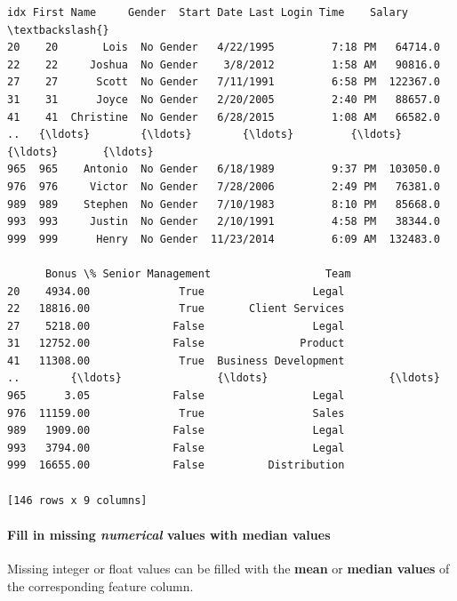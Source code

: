 \documentclass [oneside,10pt,a4paper,ngerman,BCOR10mm,headsepline,parindent,final]{scrartcl}
\makeatletter
\newcommand{\boxspacing}{\kern\kvtcb@left@rule\kern\kvtcb@boxsep}
\newcommand{\prompt}[4]{
        {\ttfamily\llap{{\color{#2}[#3]:\hspace{3pt}#4}}\vspace{-\baselineskip}}
    }
\makeatother
\begin{document}
            \begin{tcolorbox}[breakable, size=fbox, boxrule=.5pt, pad at break*=1mm, opacityfill=0]
\prompt{Out}{outcolor}{7}{\boxspacing}
\begin{Verbatim}[commandchars=\\\{\}]
     idx First Name     Gender  Start Date Last Login Time    Salary  \textbackslash{}
20    20       Lois  No Gender   4/22/1995         7:18 PM   64714.0
22    22     Joshua  No Gender    3/8/2012         1:58 AM   90816.0
27    27      Scott  No Gender   7/11/1991         6:58 PM  122367.0
31    31      Joyce  No Gender   2/20/2005         2:40 PM   88657.0
41    41  Christine  No Gender   6/28/2015         1:08 AM   66582.0
..   {\ldots}        {\ldots}        {\ldots}         {\ldots}             {\ldots}       {\ldots}
965  965    Antonio  No Gender   6/18/1989         9:37 PM  103050.0
976  976     Victor  No Gender   7/28/2006         2:49 PM   76381.0
989  989    Stephen  No Gender   7/10/1983         8:10 PM   85668.0
993  993     Justin  No Gender   2/10/1991         4:58 PM   38344.0
999  999      Henry  No Gender  11/23/2014         6:09 AM  132483.0

      Bonus \% Senior Management                  Team
20    4934.00              True                 Legal
22   18816.00              True       Client Services
27    5218.00             False                 Legal
31   12752.00             False               Product
41   11308.00              True  Business Development
..        {\ldots}               {\ldots}                   {\ldots}
965      3.05             False                 Legal
976  11159.00              True                 Sales
989   1909.00             False                 Legal
993   3794.00             False                 Legal
999  16655.00             False          Distribution

[146 rows x 9 columns]
\end{Verbatim}
\end{tcolorbox}
        
    \hypertarget{fill-in-missing-numerical-values-with-median-values}{%
\paragraph{\texorpdfstring{Fill in missing \emph{numerical} values with
median
values}{Fill in missing numerical values with median values}}\label{fill-in-missing-numerical-values-with-median-values}}

Missing integer or float values can be filled with the \textbf{mean} or
\textbf{median values} of the corresponding feature column.
\end{document}
